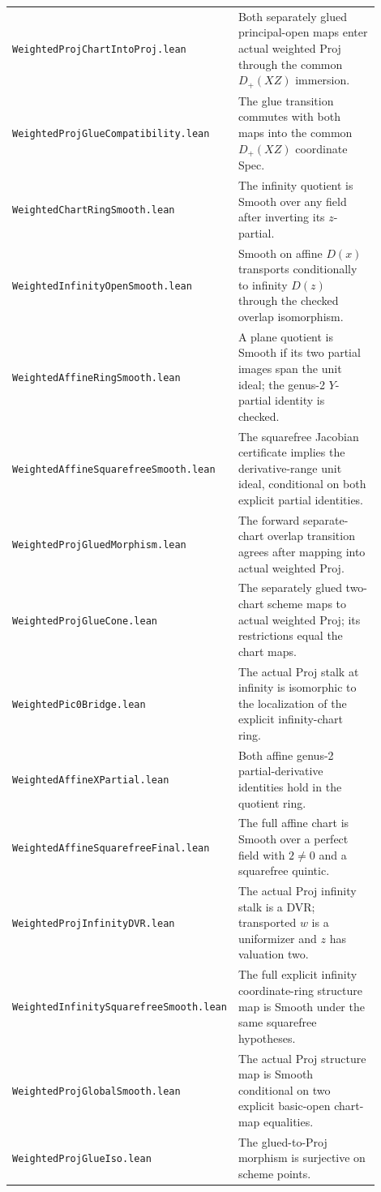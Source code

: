 \documentclass[10pt]{article}
\begin{document}
\begin{longtable}{p{0.48\linewidth}p{0.42\linewidth}}
\texttt{WeightedProjChartIntoProj.lean} & Both separately glued principal-open maps enter actual weighted Proj through the common $D_+(XZ)$ immersion.\\
\texttt{WeightedProjGlueCompatibility.lean} & The glue transition commutes with both maps into the common $D_+(XZ)$ coordinate Spec.\\
\texttt{WeightedChartRingSmooth.lean} & The infinity quotient is Smooth over any field after inverting its $z$-partial.\\
\texttt{WeightedInfinityOpenSmooth.lean} & Smooth on affine $D(x)$ transports conditionally to infinity $D(z)$ through the checked overlap isomorphism.\\
\texttt{WeightedAffineRingSmooth.lean} & A plane quotient is Smooth if its two partial images span the unit ideal; the genus-2 $Y$-partial identity is checked.\\
\texttt{WeightedAffineSquarefreeSmooth.lean} & The squarefree Jacobian certificate implies the derivative-range unit ideal, conditional on both explicit partial identities.\\
\texttt{WeightedProjGluedMorphism.lean} & The forward separate-chart overlap transition agrees after mapping into actual weighted Proj.\\
\texttt{WeightedProjGlueCone.lean} & The separately glued two-chart scheme maps to actual weighted Proj; its restrictions equal the chart maps.\\
\texttt{WeightedPic0Bridge.lean} & The actual Proj stalk at infinity is isomorphic to the localization of the explicit infinity-chart ring.\\
\texttt{WeightedAffineXPartial.lean} & Both affine genus-2 partial-derivative identities hold in the quotient ring.\\
\texttt{WeightedAffineSquarefreeFinal.lean} & The full affine chart is Smooth over a perfect field with $2\ne0$ and a squarefree quintic.\\
\texttt{WeightedProjInfinityDVR.lean} & The actual Proj infinity stalk is a DVR; transported $w$ is a uniformizer and $z$ has valuation two.\\
\texttt{WeightedInfinitySquarefreeSmooth.lean} & The full explicit infinity coordinate-ring structure map is Smooth under the same squarefree hypotheses.\\
\texttt{WeightedProjGlobalSmooth.lean} & The actual Proj structure map is Smooth conditional on two explicit basic-open chart-map equalities.\\
\texttt{WeightedProjGlueIso.lean} & The glued-to-Proj morphism is surjective on scheme points.\\

\end{longtable}
\end{document}
